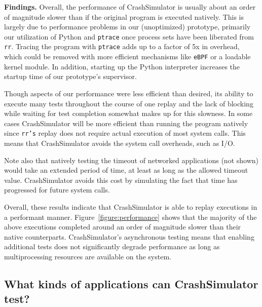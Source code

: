 {\bf Findings.} Overall, the performance of CrashSimulator is usually
about an order of magnitude slower than if the original program is executed
natively.  This is largely due to performance problems in our (unoptimized)
prototype, primarily our utilization of Python and {\tt ptrace} once
process sets have been liberated from {\tt rr}.  Tracing the program
with {\tt ptrace} adds up to a factor of 5x in overhead,  which could be
removed with more efficient mechanisms like {\tt eBPF} or a loadable kernel
module.  In addition, starting up the Python interpreter increases the
startup time of our prototype's supervisor.

Though aspects of our performance were less efficient than desired, its
ability to execute many tests throughout the course of one replay and the
lack of blocking while waiting for test completion somewhat makes up for
this slowness. In some cases CrashSimulator will be more efficient than
running the program natively since {\tt rr's} replay does not require
actual execution of most system calls.  This means that CrashSimulator
avoids the system call overheads, such as I/O.

Note also that natively testing the timeout of networked applications (not
shown) would take an extended period of time, at least as long as the
allowed timeout value.  CrashSimulator avoids this cost by simulating the
fact that time has progressed for future system calls.

Overall, these results indicate that CrashSimulator is able to replay
executions in a performant manner.  Figure~\ref{figure:performance} shows
that the majority of the above executions completed around an order of
magnitude slower than their native counterparts.  CrashSimulator's
asynchronous testing means that enabling additional tests does not
significantly degrade performance as long as multiprocessing resources are
available on the system.


\subsection{What kinds of applications can CrashSimulator test?}


